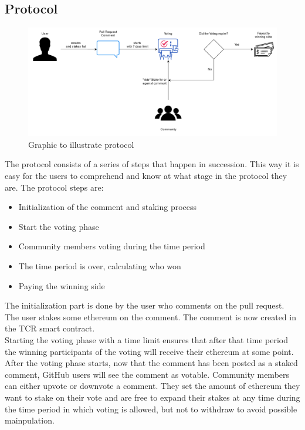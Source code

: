 \documentclass[sigconf]{acmart}
\begin{document}
\subsection{Protocol}

\begin{figure}
\includegraphics[width=\textwidth]{Protocol Grafik.png}
\caption{Graphic to illustrate protocol}
\label{fig:ds}
\end{figure}

The protocol consists of a series of steps that happen in succession. This way it is easy for the users to comprehend and know at what stage in the protocol they are.
The protocol steps are:
\begin{itemize}
\item Initialization of the comment and staking process
\item Start the voting phase
\item Community members voting during the time period
\item The time period is over, calculating who won
\item Paying the winning side
\end{itemize}
The initialization part is done by the user who comments on the pull request. The user stakes some ethereum on the comment. The comment is now created in the TCR smart contract.\\

Starting the voting phase with a time limit ensures that after that time period the winning participants of the voting will receive their ethereum at some point.\\

After the voting phase starts, now that the comment has been posted as a staked comment, GitHub users will see the comment as votable.
Community members can either upvote or downvote a comment. They set the amount of ethereum they want to stake on their vote and are free to expand their stakes at any time during the time period in which voting is allowed, but not to withdraw to avoid possible mainpulation.\\
\end{document}

